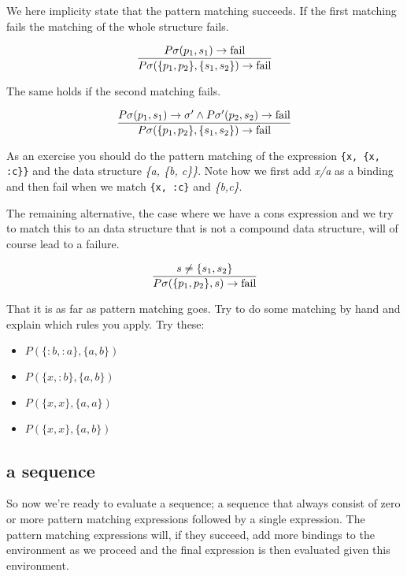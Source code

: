 \documentclass[a4paper,11pt]{article}
\begin{document}
We here implicity state that the pattern matching succeeds. If the first matching fails the matching of the whole structure fails.

$$\frac{P\sigma(p_1, s_1) \rightarrow {\rm fail} }{P\sigma(\lbrace p_1, p_2 \rbrace  , \lbrace s_1, s_2 \rbrace) \rightarrow {\rm fail}}$$

The same holds if the second matching fails.

$$\frac{P\sigma(p_1, s_1) \rightarrow \sigma' \wedge P\sigma'(p_2, s_2) \rightarrow {\rm fail}}{P\sigma(\lbrace p_1, p_2 \rbrace  , \lbrace s_1, s_2 \rbrace) \rightarrow {\rm fail}}$$


As an exercise you should do the pattern matching of the expression
{\tt \{x, \{x, :c\}\}} and the data structure {\em \{a, \{b, c\}\}}. Note
how we first add {\em x/a} as a binding and then fail when
we match {\tt \{x, :c\}} and {\em \{b,c\}}.

The remaining alternative, the case where we have a cons expression and
we try to match this to an data structure that is not a compound data
structure, will of course lead to a failure.

$$\frac{s \not = \{s_1, s_2\}}{P\sigma(\lbrace p_1, p_2 \rbrace, s) \rightarrow {\rm fail}}$$

That it is as far as pattern matching goes. Try to do some matching by
hand and explain which rules you apply. Try these:

\begin{itemize}
  
\item $P{}(\lbrace :b, :a \rbrace, \lbrace a, b \rbrace)$  
\item $P{}(\lbrace x, :b \rbrace, \lbrace a, b \rbrace)$
\item $P{}(\lbrace x, x \rbrace, \lbrace a, a \rbrace)$
\item $P{}(\lbrace x, x \rbrace, \lbrace a, b \rbrace)$
\end{itemize}


\subsection{a sequence}

So now we're ready to evaluate a sequence; a sequence that always
consist of zero or more pattern matching expressions followed by a
single expression. The pattern matching expressions will, if they
succeed, add more bindings to the environment as we proceed and the
final expression is then evaluated given this environment.
\end{document}
